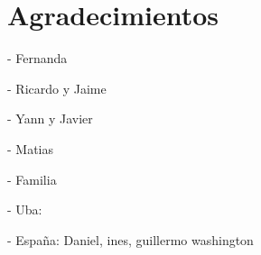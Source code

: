 \chapter*{Agradecimientos}

- Fernanda

- Ricardo y Jaime

- Yann y Javier

- Matias 

- Familia

- Uba: 

- Espa\~na: Daniel, ines, guillermo washington
